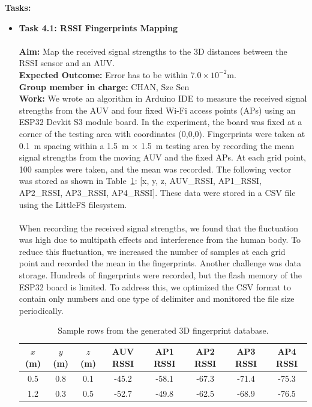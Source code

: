 \documentclass[11pt]{article}
\begin{document}
        \textbf{Tasks:}
        \begin{itemize}
            \item \textbf{Task 4.1: RSSI Fingerprints Mapping}\\\\
            \textbf{Aim:} Map the received signal strengths to the 3D distances between the RSSI sensor and an AUV.\\
            \textbf{Expected Outcome:} Error has to be within $7.0\times10^{-2}$m.\\
            \textbf{Group member in charge:} CHAN, Sze Sen\\
            \textbf{Work:} We wrote an algorithm in Arduino IDE to measure the received signal strengths from the AUV and four fixed Wi-Fi access points (APs) using an ESP32 Devkit S3 module board. In the experiment, the board was fixed at a corner of the testing area with coordinates (0,0,0). Fingerprints were taken at 0.1~m spacing within a 1.5~m $\times$ 1.5~m testing area by recording the mean signal strengths from the moving AUV and the fixed APs. At each grid point, 100 samples were taken, and the mean was recorded. The following vector was stored as shown in Table~\ref{tab:fingerprint_sample}: [x, y, z, AUV\_RSSI, AP1\_RSSI, AP2\_RSSI, AP3\_RSSI, AP4\_RSSI]. These data were stored in a CSV file using the LittleFS filesystem.\\\\
            When recording the received signal strengths, we found that the fluctuation was high due to multipath effects and interference from the human body. To reduce this fluctuation, we increased the number of samples at each grid point and recorded the mean in the fingerprints. Another challenge was data storage. Hundreds of fingerprints were recorded, but the flash memory of the ESP32 board is limited. To address this, we optimized the CSV format to contain only numbers and one type of delimiter and monitored the file size periodically.

            \begin{table}[H]
                \centering
                \caption{Sample rows from the generated 3D fingerprint database.}
                \begin{tabular}[c]{| c | c | c | c | c | c | c | c |}
                    \hline
                    $x$ (m) & $y$ (m) & $z$ (m) & AUV RSSI & AP1 RSSI & AP2 RSSI & AP3 RSSI & AP4 RSSI \\
                    \hline
                    0.5 & 0.8 & 0.1 & -45.2 & -58.1 & -67.3 & -71.4 & -75.3 \\
                    \hline
                    1.2 & 0.3 & 0.5 & -52.7 & -49.8 & -62.5 & -68.9 & -76.5 \\
                    \hline
                \end{tabular}
                \label{tab:fingerprint_sample}
            \end{table}


\end{itemize}
\end{document}
